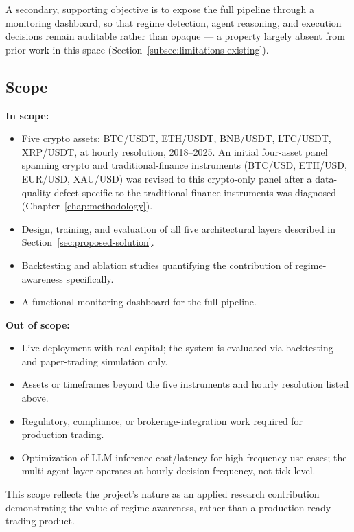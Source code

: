 A secondary, supporting objective is to expose the full pipeline through a monitoring dashboard, so that regime detection, agent reasoning, and execution decisions remain auditable rather than opaque --- a property largely absent from prior work in this space (Section~\ref{subsec:limitations-existing}).

\subsection{Scope}
\label{subsec:scope}

\textbf{In scope:}
\begin{itemize}
    \item Five crypto assets: BTC/USDT, ETH/USDT, BNB/USDT, LTC/USDT, XRP/USDT, at hourly resolution, 2018--2025. An initial four-asset panel spanning crypto and traditional-finance instruments (BTC/USD, ETH/USD, EUR/USD, XAU/USD) was revised to this crypto-only panel after a data-quality defect specific to the traditional-finance instruments was diagnosed (Chapter~\ref{chap:methodology}).
    \item Design, training, and evaluation of all five architectural layers described in Section~\ref{sec:proposed-solution}.
    \item Backtesting and ablation studies quantifying the contribution of regime-awareness specifically.
    \item A functional monitoring dashboard for the full pipeline.
\end{itemize}

\textbf{Out of scope:}
\begin{itemize}
    \item Live deployment with real capital; the system is evaluated via backtesting and paper-trading simulation only.
    \item Assets or timeframes beyond the five instruments and hourly resolution listed above.
    \item Regulatory, compliance, or brokerage-integration work required for production trading.
    \item Optimization of LLM inference cost/latency for high-frequency use cases; the multi-agent layer operates at hourly decision frequency, not tick-level.
\end{itemize}

This scope reflects the project's nature as an applied research contribution demonstrating the value of regime-awareness, rather than a production-ready trading product.

